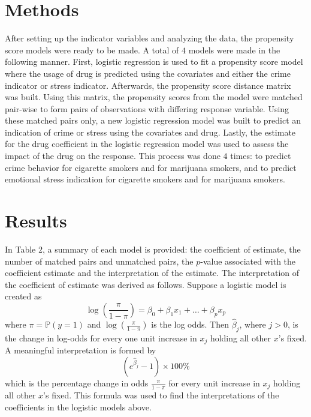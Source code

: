 \documentclass[a4paper, 10pt, conference]{ieeeconf}
\begin{document}
\section{Methods} 
\parindent 10pt After setting up the indicator variables and analyzing the data, the propensity score models were ready to be made. A total of $4$ models were made in the following manner. First, logistic regression is used to fit a propensity score model where the usage of drug is predicted using the covariates and either the crime indicator or stress indicator. Afterwards, the propensity score distance matrix was built. Using this matrix, the propensity scores from the model were matched pair-wise to form pairs of observations with differing response variable. Using these matched pairs only, a new logistic regression model was built to predict an indication of crime or stress using the covariates and drug. Lastly, the estimate for the drug coefficient in the logistic regression model was used to assess the impact of the drug on the response. This process was done $4$ times: to predict crime behavior for cigarette smokers and for marijuana smokers, and to predict emotional stress indication for cigarette smokers and for marijuana smokers. 

\section{Results}
In Table 2, a summary of each model is provided: the coefficient of estimate, the number of matched pairs and unmatched pairs, the $p$-value associated with the coefficient estimate and the interpretation of the estimate. The interpretation of the coefficient of estimate was derived as follows. Suppose a logistic model is created as $$ \log \left( \frac{\pi}{1-\pi} \right) = \beta_0 + \beta_1x_1 + \dots + \beta_px_p $$ where $\pi = \mathds{P}(y = 1)$ and $\log \left( \frac{\pi}{1-\pi} \right)$ is the log odds. Then $\hat{\beta}_j$, where $j > 0$, is the change in log-odds for every one unit increase in $x_j$ holding all other $x$'s fixed. A meaningful interpretation is formed by $$ (e^{\hat{\beta}_j} - 1) \times 100\%$$ which is the percentage change in odds $\frac{\pi}{1-\pi}$ for every unit increase in $x_j$ holding all other $x$'s fixed. This formula was used to find the interpretations of the coefficients in the logistic models above.  
\end{document}
